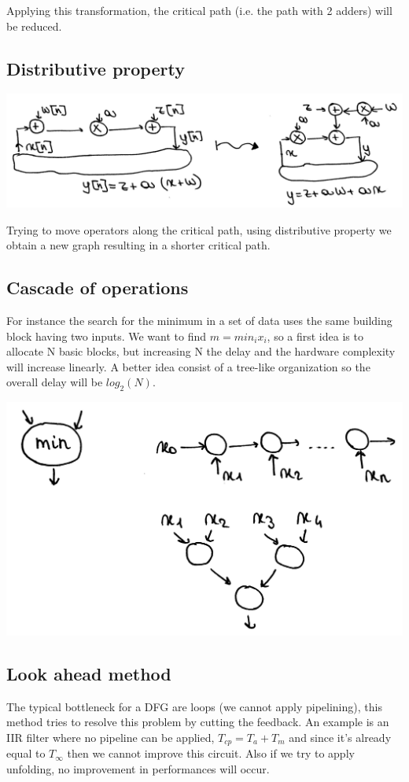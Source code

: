 Applying this transformation, the critical path (i.e. the path with 2 adders) will be reduced.

\subsection{Distributive property}

\begin{center}
  \includegraphics[width=0.7\linewidth]{img/img1/43}
\end{center}

Trying to move operators along the critical path, using distributive property we obtain a new graph resulting in a shorter critical path.

\subsection{Cascade of operations}

For instance the search for the minimum in a set of data uses the same building block having two inputs.
We want to find $m= min_i{x_i}$, so a first idea is to allocate N basic blocks, but increasing N the delay and the hardware complexity will increase linearly.
A better idea consist of a tree-like organization so the overall delay will be $log_2 (N)$.
\begin{center}
  \includegraphics[width=0.7\linewidth]{img/img1/44}
\end{center}

\subsection{Look ahead method}
The typical bottleneck for a DFG are loops (we cannot apply pipelining), this method tries to resolve this problem by cutting the feedback.
An example is an IIR filter where no pipeline can be applied, $T_{cp}= T_a + T_m $ and since it's already equal to $T_{\infty}$ then we cannot improve this circuit.
Also if we try to apply unfolding, no improvement in performances will occur.

